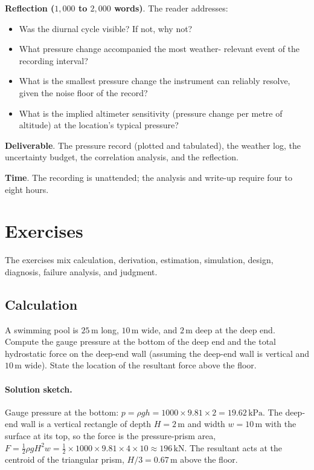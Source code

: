 \begin{project}
\textbf{Reflection ($1{,}000$ to $2{,}000$ words)}. The reader
addresses:

\begin{itemize}[leftmargin=*]
  \item Was the diurnal cycle visible? If not, why not?
  \item What pressure change accompanied the most weather-
    relevant event of the recording interval?
  \item What is the smallest pressure change the instrument can
    reliably resolve, given the noise floor of the record?
  \item What is the implied altimeter sensitivity (pressure
    change per metre of altitude) at the location's typical
    pressure?
\end{itemize}

\textbf{Deliverable}. The pressure record (plotted and
tabulated), the weather log, the uncertainty budget, the
correlation analysis, and the reflection.

\textbf{Time}. The recording is unattended; the analysis and
write-up require four to eight hours.
\end{project}

\section{Exercises}

The exercises mix calculation, derivation, estimation, simulation,
design, diagnosis, failure analysis, and judgment.

\subsection*{Calculation}

\begin{exercise}
A swimming pool is $25\,\si{\meter}$ long, $10\,\si{\meter}$
wide, and $2\,\si{\meter}$ deep at the deep end. Compute the
gauge pressure at the bottom of the deep end and the total
hydrostatic force on the deep-end wall (assuming the deep-end
wall is vertical and $10\,\si{\meter}$ wide). State the location
of the resultant force above the floor.

\paragraph{Solution sketch.} Gauge pressure at the bottom:
$p = \rho g h = 1000 \times 9.81 \times 2 = 19.62\,\text{kPa}$. The
deep-end wall is a vertical rectangle of depth $H = 2\,\si{\meter}$ and
width $w = 10\,\si{\meter}$ with the surface at its top, so the force is
the pressure-prism area, $F = \tfrac12 \rho g H^2 w = \tfrac12 \times
1000 \times 9.81 \times 4 \times 10 \approx 196\,\text{kN}$. The
resultant acts at the centroid of the triangular prism, $H/3 =
0.67\,\si{\meter}$ above the floor.
\end{exercise}

